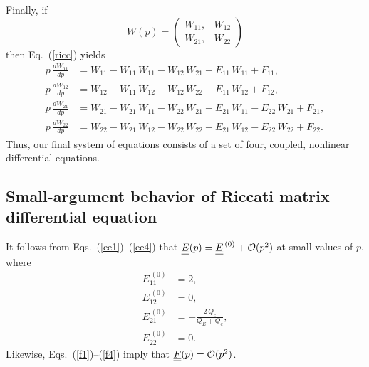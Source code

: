 \documentclass[12pt,prb,aps]{revtex4-1}
\begin{document}
Finally, if 
\begin{equation}
\underline{\underline{W}}(p)= \left(\begin{array}{cc} W_{11},&W_{12}\\W_{21},&W_{22}\end{array}\right)
\end{equation}
then Eq.~(\ref{ricc}) yields 
\begin{align}\label{err1}
p\,\frac{dW_{11}}{dp}  &= W_{11}  - W_{11}\,W_{11}-W_{12}\,W_{21}- E_{11}\,W_{11} + F_{11},\\[0.5ex]
p\,\frac{dW_{12}}{dp} &= W_{12} - W_{11}\,W_{12} - W_{12}\,W_{22} - E_{11}\,W_{12} + F_{12},\\[0.5ex]
p\,\frac{dW_{21}}{dp} &= W_{21} -W_{21}\,W_{11}- W_{22}\,W_{21} - E_{21}\,W_{11} - E_{22}\,W_{21} + F_{21},\\[0.5ex]
p\,\frac{dW_{22}}{dp} &= W_{22} -W_{21}\,W_{12}- W_{22}\,W_{22}- E_{21}\,W_{12} - E_{22}\,W_{22} + F_{22}.\label{err4}
\end{align}
Thus, our final system of equations consists of a set of four, coupled, nonlinear differential equations. 

\subsection{Small-argument behavior of Riccati matrix differential equation}
It follows from Eqs.~(\ref{ee1})--(\ref{ee4})  that  $\underline{\underline{E}}(p) = \underline{\underline{E}}^{\,(0)} + {\cal O}(p^2)$ at small values of $p$,
where 
\begin{align}
E_{11}^{\,(0)} &= 2,\\[0.5ex]
E_{12}^{\,(0)}&=0,\\[0.5ex]
E_{21}^{\,(0)} &= - \frac{2\,Q_e}{Q_E+Q_e},\label{e210}\\[0.5ex]
E_{22}^{\,(0)}&= 0.
\end{align}
Likewise,  Eqs.~(\ref{f1})--(\ref{f4}) imply that $\underline{\underline{F}}(p) ={\cal O}(p^2)$.
\end{document}
